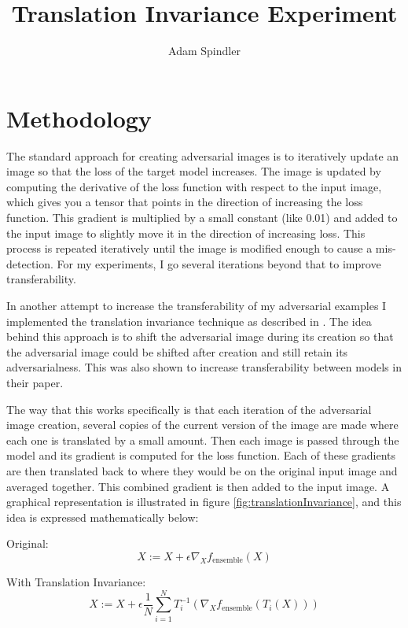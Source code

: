 \documentclass{article}
\title{Translation Invariance Experiment}
\author{Adam Spindler}
\begin{document}
\maketitle

\section{Methodology}


The standard approach for creating adversarial images is to iteratively update an image so that the loss of the target model increases. The image is updated by computing the derivative of the loss function with respect to the input image, which gives you a tensor that points in the direction of increasing the loss function. This gradient is multiplied by a small constant (like 0.01) and added to the input image to slightly move it in the direction of increasing loss. This process is repeated iteratively until the image is modified enough to cause a mis-detection. For my experiments, I go several iterations beyond that to improve transferability.

In another attempt to increase the transferability of my adversarial examples I implemented the translation invariance technique as described in \cite{dong2019evading}. The idea behind this approach is to shift the adversarial image during its creation so that the adversarial image could be shifted after creation and still retain its adversarialness. This was also shown to increase transferability between models in their paper.

The way that this works specifically is that each iteration of the adversarial image creation, several copies of the current version of the image are made where each one is translated by a small amount. Then each image is passed through the model and its gradient is computed for the loss function. Each of these gradients are then translated back to where they would be on the original input image and averaged together. This combined gradient is then added to the input image. A graphical representation is illustrated in figure \ref{fig:translationInvariance}, and this idea is expressed mathematically below:
\vspace{0.5cm}

Original:
\begin{equation}
    X := X + \epsilon \nabla_X f_\text{ensemble}(X) 
\end{equation}

With Translation Invariance:
\begin{equation}
    X := X + \epsilon \frac{1}{N} \sum_{i = 1}^{N} T_i^{-1}(\nabla_X f_\text{ensemble}(T_i(X)))
\end{equation}
\end{document}
